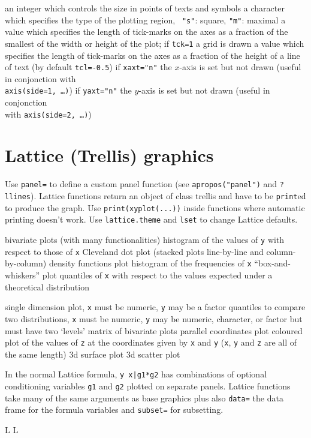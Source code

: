 	{ an integer which controls the size in points of texts and symbols}
	{ a character which specifies the type of the plotting region, {\tt
"s"}: square, {\tt "m"}: maximal}
	{a value which specifies the length of tick-marks on the axes as a
fraction of the smallest of the width or height of the plot; if {\tt tck=1} a
grid is drawn}
	{ a value which specifies the length of tick-marks on the axes as a fraction of the height of a line of text (by default {\tt tcl=-0.5})}
	{if {\tt xaxt="n"} the $x$-axis is set but not drawn (useful in
    conjonction with\\
    {\tt axis(side=1, \ldots)})}
	{if {\tt yaxt="n"} the $y$-axis is set but not drawn (useful in
conjonction \\with {\tt axis(side=2, \ldots)})}

\section{Lattice (Trellis) graphics}{ Use {\tt panel=} to define a custom panel
    function (see {\tt apropos("panel")} and {\tt ?llines}). Lattice functions
    return an object of class trellis and have to be {\tt print}ed to produce
    the graph. Use {\tt print(xyplot(...))} inside functions where automatic
    printing doesn't work. Use {\tt lattice.theme} and {\tt lset} to change
    Lattice defaults.}

	{ bivariate plots (with many functionalities)}
	{  histogram of the values of {\tt y} with respect to those of {\tt x}}
	{ Cleveland dot plot (stacked plots line-by-line and
column-by-column)}
	{ density functions plot}
	{ histogram of the frequencies of {\tt x}}
	{ ``box-and-whiskers'' plot}
	{  quantiles of {\tt x} with respect to the values
expected under a theoretical distribution}

	{  single dimension plot, {\tt x} must be numeric, {\tt y} may be a factor}
	{quantiles to compare two distributions, {\tt x} must be
numeric, {\tt y} may be numeric, character, or factor but must have two
`levels'}
	{ matrix of bivariate plots}
	{ parallel coordinates plot}
	{coloured plot of the values of {\tt z} at
the coordinates given by {\tt x} and {\tt y} ({\tt x}, {\tt y} and {\tt z} are
all of the same length)}
	{ 3d surface plot}
	{ 3d scatter plot}

In the normal Lattice formula, {\tt y~x|g1*g2} has
combinations of optional conditioning variables {\tt g1} and {\tt g2} plotted
on separate panels. Lattice functions take many of the same arguments as base
graphics plus also {\tt data=} the data frame for the formula variables and
{\tt subset=} for subsetting.



\copyrightnotice

\supereject
\if L\lr \else\null\vfill\eject\fi
\if L\lr \else\null\vfill\eject\fi
\bye

